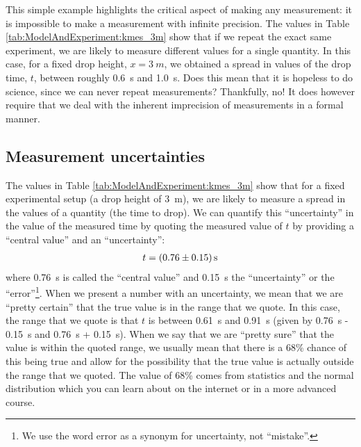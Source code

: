 This simple example highlights the critical aspect of making any measurement: it is impossible to make a measurement with infinite precision. The values in Table \ref{tab:ModelAndExperiment:kmes_3m} show that if we repeat the exact same experiment, we are likely to measure different values for a single quantity. In this case, for a fixed drop height, $x=\SI{3}{m}$, we obtained a spread in values of the drop time, $t$, between roughly \SI{0.6}{s} and \SI{1.0}{s}. Does this mean that it is hopeless to do science, since we can never repeat measurements? Thankfully, no! It does however require that we deal with the inherent imprecision of measurements in a formal manner.

\subsection{Measurement uncertainties}
The values in Table \ref{tab:ModelAndExperiment:kmes_3m} show that for a fixed experimental setup (a drop height of \SI{3}{m}), we are likely to measure a spread in the values of a quantity (the time to drop). We can quantify this ``uncertainty'' in the value of the measured time by quoting the measured value of $t$ by providing a ``central value'' and an ``uncertainty'':
\begin{align*}
t = \SI{0.76 \pm 0.15}{s}
\end{align*}
where \SI{0.76}{s} is called the ``central value'' and \SI{0.15}{s} the ``uncertainty'' or the ``error''\footnote{We use the word error as a synonym for uncertainty, not ``mistake''.}. When we present a number with an uncertainty, we mean that we are ``pretty certain'' that the true value is in the range that we quote. In this case, the range that we quote is that $t$ is between \SI{0.61}{s} and \SI{0.91}{s} (given by \SI{0.76}{s} - \SI{0.15}{s} and \SI{0.76}{s} + \SI{0.15}{s}). When we say that we are ``pretty sure'' that the value is within the quoted range, we usually mean that there is a 68\% chance of this being true and allow for the possibility that the true value is actually outside the range that we quoted. The value of 68\% comes from statistics and the normal distribution which you can learn about on the internet or in a more advanced course. 

